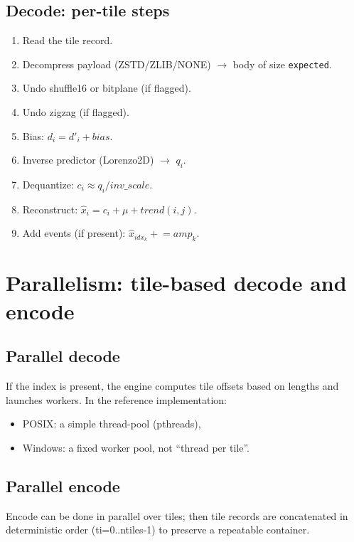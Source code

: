 \documentclass[11pt,a4paper]{article}
\begin{document}
\subsection{Decode: per-tile steps}
\begin{enumerate}
  \item Read the tile record.
  \item Decompress payload (ZSTD/ZLIB/NONE) $\rightarrow$ body of size \texttt{expected}.
  \item Undo shuffle16 or bitplane (if flagged).
  \item Undo zigzag (if flagged).
  \item Bias: $d_i = d'_i + bias$.
  \item Inverse predictor (Lorenzo2D) $\rightarrow$ $q_i$.
  \item Dequantize: $c_i \approx q_i / inv\_scale$.
  \item Reconstruct: $\hat{x}_i = c_i + \mu + trend(i,j)$.
  \item Add events (if present): $\hat{x}_{idx_k} \mathrel{+}= amp_k$.
\end{enumerate}

\section{Parallelism: tile-based decode and encode}

\subsection{Parallel decode}
If the index is present, the engine computes tile offsets based on lengths and launches workers.
In the reference implementation:
\begin{itemize}
  \item POSIX: a simple thread-pool (pthreads),
  \item Windows: a fixed worker pool, not ``thread per tile''.
\end{itemize}

\subsection{Parallel encode}
Encode can be done in parallel over tiles; then tile records are concatenated in deterministic order (ti=0..ntiles-1) to preserve a repeatable container.

\end{document}
